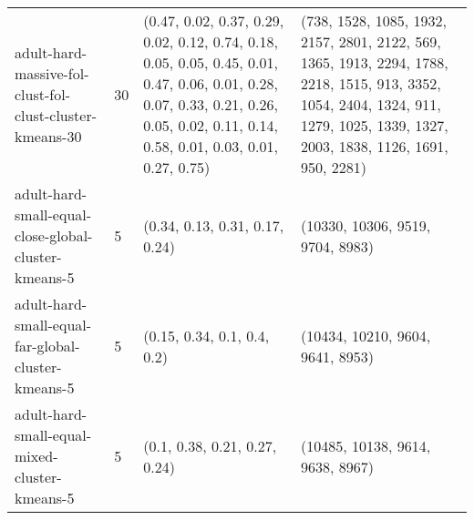 \begin{longtable}{llll}
                                                     adult-hard-massive-fol-clust-fol-clust-cluster-kmeans-30 &             30 &                                                                                                                      (0.47, 0.02, 0.37, 0.29, 0.02, 0.12, 0.74, 0.18, 0.05, 0.05, 0.45, 0.01, 0.47, 0.06, 0.01, 0.28, 0.07, 0.33, 0.21, 0.26, 0.05, 0.02, 0.11, 0.14, 0.58, 0.01, 0.03, 0.01, 0.27, 0.75) &                                                                                                                           (738, 1528, 1085, 1932, 2157, 2801, 2122, 569, 1365, 1913, 2294, 1788, 2218, 1515, 913, 3352, 1054, 2404, 1324, 911, 1279, 1025, 1339, 1327, 2003, 1838, 1126, 1691, 950, 2281) \\
                                                         adult-hard-small-equal-close-global-cluster-kmeans-5 &              5 &                                                                                                                                                                                                                                                                            (0.34, 0.13, 0.31, 0.17, 0.24) &                                                                                                                                                                                                                                                                          (10330, 10306, 9519, 9704, 8983) \\
                                                           adult-hard-small-equal-far-global-cluster-kmeans-5 &              5 &                                                                                                                                                                                                                                                                               (0.15, 0.34, 0.1, 0.4, 0.2) &                                                                                                                                                                                                                                                                          (10434, 10210, 9604, 9641, 8953) \\
                                                                adult-hard-small-equal-mixed-cluster-kmeans-5 &              5 &                                                                                                                                                                                                                                                                             (0.1, 0.38, 0.21, 0.27, 0.24) &                                                                                                                                                                                                                                                                          (10485, 10138, 9614, 9638, 8967) \\

\end{longtable}
